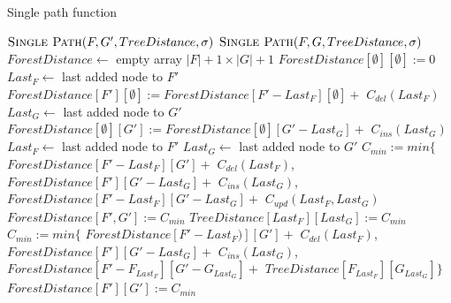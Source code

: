 \begin{algorithm}
  \caption{Single path function}
  \label{alg:spf}
  \begin{algorithmic}[1]
          \State $\Call{Single Path}{F, G', TreeDistance, \sigma}$
        \EndFor
      \Else
          \State $\Call{Single Path}{F, G, TreeDistance, \sigma}$
        \EndFor
      \EndIf
    \EndProcedure
    \\
      \State $ForestDistance \gets$ empty array $|F| + 1 \times |G| + 1$
      \State $ForestDistance[\emptyset][\emptyset] := 0$
        \State $Last_{F} \gets$ last added node to $F'$
        \State $ForestDistance[F'][\emptyset] := ForestDistance[F' - Last_{F}][\emptyset] +$
        \Indent
          \State $C_{del}(Last_{F})$
        \EndIndent
      \EndFor
        \State $Last_{G} \gets$ last added node to $G'$
        \State $ForestDistance[\emptyset][G'] := ForestDistance[\emptyset][G' - Last_{G}] +$
        \Indent
          \State $C_{ins}(Last_{G})$
        \EndIndent
      \EndFor
          \State $Last_{F} \gets$ last added node to $F'$
          \State $Last_{G} \gets$ last added node to $G'$
          \label{alg:spf:iftrees}
            \State $C_{min} := min \{$
            \Indent
            \State $ForestDistance[F' - Last_{F}][G'] +$
              \Indent
                \State $C_{del}(Last_{F})$,
              \EndIndent
              \State $ForestDistance[F'][G' - Last_{G}] +$
              \Indent
                \State $C_{ins}(Last_{G})$,
              \EndIndent
              \State $ForestDistance[F' - Last_{F}][G' - Last_{G}] +$
              \Indent
                \State $C_{upd}(Last_{F}, Last_{G})$
              \EndIndent
            \EndIndent
            \State $ForestDistance[F', G'] := C_{min}$
            \State $TreeDistance[Last_{F}][Last_{G}] := C_{min}$
          \Else
          \label{alg:spf:ifforests}
            \State $C_{min} := min \{$
            \Indent
              \State $ForestDistance[F' - Last_{F})][G'] +$
              \Indent
                \State $C_{del}(Last_{F})$,
              \EndIndent
              \State $ForestDistance[F'][G' - Last_{G}] +$
              \Indent
                \State $C_{ins}(Last_{G})$,
              \EndIndent
              \State $ForestDistance[F' - F_{Last_{F}}][G' - G_{Last_{G}}] +$
              \Indent
                \State $TreeDistance[F_{Last_{F}}][G_{Last_{G}}]\}$
              \EndIndent
            \EndIndent
            \State $ForestDistance[F'][G'] := C_{min}$
          \EndIf
        \EndFor
      \EndFor
    \EndProcedure
  \end{algorithmic}
\end{algorithm}


